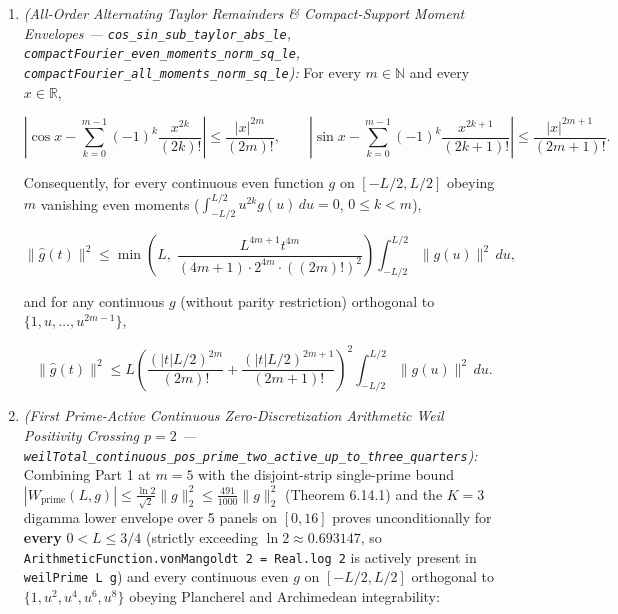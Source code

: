 \documentclass[
  11pt,
]{article}
\begin{document}
\begin{enumerate}
\def\labelenumi{\arabic{enumi}.}
\item
  \emph{(All-Order Alternating Taylor Remainders \& Compact-Support
  Moment Envelopes --- \texttt{cos\_sin\_sub\_taylor\_abs\_le},
  \texttt{compactFourier\_even\_moments\_norm\_sq\_le},
  \texttt{compactFourier\_all\_moments\_norm\_sq\_le}):} For every
  \(m \in \mathbb{N}\) and every \(x \in \mathbb{R}\),

  \[\left|\cos x - \sum_{k=0}^{m-1} (-1)^k \frac{x^{2k}}{(2k)!}\right| \le \frac{|x|^{2m}}{(2m)!}, \qquad \left|\sin x - \sum_{k=0}^{m-1} (-1)^k \frac{x^{2k+1}}{(2k+1)!}\right| \le \frac{|x|^{2m+1}}{(2m+1)!}.\]

  Consequently, for every continuous even function \(g\) on
  \([-L/2, L/2]\) obeying \(m\) vanishing even moments
  (\(\int_{-L/2}^{L/2} u^{2k} g(u)\,du = 0\), \(0 \le k < m\)),

  \[\|\widehat{g}(t)\|^2 \le \min\!\left(L,\; \frac{L^{4m+1} t^{4m}}{(4m+1)\cdot 2^{4m}\cdot ((2m)!)^2}\right) \int_{-L/2}^{L/2} \|g(u)\|^2\,du,\]

  and for any continuous \(g\) (without parity restriction) orthogonal
  to \(\{1, u, \dots, u^{2m-1}\}\),

  \[\|\widehat{g}(t)\|^2 \le L\left(\frac{(|t|L/2)^{2m}}{(2m)!} + \frac{(|t|L/2)^{2m+1}}{(2m+1)!}\right)^2 \int_{-L/2}^{L/2} \|g(u)\|^2\,du.\]
\item
  \emph{(First Prime-Active Continuous Zero-Discretization Arithmetic
  Weil Positivity Crossing \(p = 2\) ---
  \texttt{weilTotal\_continuous\_pos\_prime\_two\_active\_up\_to\_three\_quarters}):}
  Combining Part 1 at \(m = 5\) with the disjoint-strip single-prime
  bound
  \(|W_{\text{prime}}(L, g)| \le \frac{\ln 2}{\sqrt{2}}\|g\|_2^2 \le \frac{491}{1000}\|g\|_2^2\)
  (Theorem 6.14.1) and the \(K = 3\) digamma lower envelope over 5
  panels on \([0, 16]\) proves unconditionally for \textbf{every}
  \(0 < L \le 3/4\) (strictly exceeding \(\ln 2 \approx 0.693147\), so
  \texttt{ArithmeticFunction.vonMangoldt\ 2\ =\ Real.log\ 2} is actively
  present in \texttt{weilPrime\ L\ g}) and every continuous even \(g\)
  on \([-L/2, L/2]\) orthogonal to \(\{1, u^2, u^4, u^6, u^8\}\) obeying
  Plancherel and Archimedean integrability:


\end{enumerate}
\end{document}
